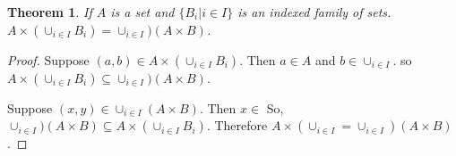 

\newtheorem{theorem}{Theorem}

\begin{theorem}
  If $A$ is a set and $\{B_i | i \in I\}$ is an indexed family of sets. $A
  \times (\cup_{i\in I}B_i) =\cup_{i\in I})(A \times B)$.
\end{theorem}

\begin{proof}
  Suppose $(a,b) \in A \times (\cup_{i\in I}B_i)$. Then $a \in A$ and $b \in
  \cup_{i\in I}$.
  so $A \times (\cup_{i\in I}B_i) \subseteq \cup_{i\in I})(A \times B)$.

  Suppose $(x,y) \in \cup_{i\in I}(A \times B)$. Then $x \in$ So, $\cup_{i\in
  I})(A \times B) \subseteq A \times (\cup_{i\in I}B_i)$.
  Therefore $A \times (\cup_{i\in I}=\cup_{i\in I})(A \times B)$.
\end{proof}
